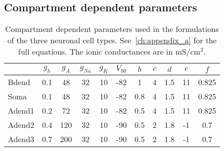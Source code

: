 \subsection{Compartment dependent parameters}
\begin{table}[htbp]
    \centering
    \caption[Compartment dependent parameters]{Compartment dependent parameters used in the formulations of the three neuronal cell types. See~\ref{ch:appendix_a} for the full equations. The ionic conductances are in mS/cm\(^2\).}\label{table:compartment_dependent_parameters}
    \begin{tabular}{l|cccccccccc}
        \hline
        \hline
               & \( g_{h} \) & \( g_{A} \) & \( g_{Na} \) & \( g_{K} \) & \( V_{50} \) & \( b \) & \( c \) & \( d \) & \( e \) & \( f \) \\
        \hline
        Bdend  & 0.1         & 48          & 32           & 10          & -82          & 1       & 4       & 1.5     & 11      & 0.825   \\
        Soma   & 0.1         & 48          & 32           & 10          & -82          & 0.8     & 4       & 1.5     & 11      & 0.825   \\
        Adend1 & 0.2         & 72          & 32           & 10          & -82          & 0.5     & 4       & 1.5     & 11      & 0.825   \\
        Adend2 & 0.4         & 120         & 32           & 10          & -90          & 0.5     & 2       & 1.8     & -1      & 0.7     \\
        Adend3 & 0.7         & 200         & 32           & 10          & -90          & 0.5     & 2       & 1.8     & -1      & 0.7     \\
        \hline
        \hline
    \end{tabular}
\end{table}

